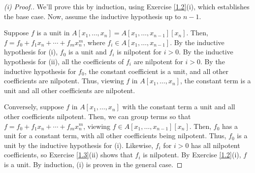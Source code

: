 \begin{proof}[(i) Proof.]
We'll prove this by induction, using Exercise \ref{1.2}(i), which establishes the base case. Now, assume the inductive hypothesis up to $n-1$.

Suppose $f$ is a unit in $A[x_1,\ldots,x_n] = A[x_1,\ldots,x_{n-1}][x_n]$. Then, $f = f_0 + f_1 x_n + \cdots + f_m x_n^m$, where 
$f_i \in A[x_1,\ldots,x_{n-1}]$. By the inductive hypothesis for (i), $f_0$ is a unit and $f_i$ is nilpotent for $i > 0$. By the inductive hypothesis 
for (ii), all the coefficients of $f_i$ are nilpotent for $i > 0$. By the inductive hypothesis for $f_0$, the constant coefficient is a unit, and all
other coefficients are nilpotent. Thus, viewing $f$ in $A[x_1,\ldots,x_n]$, the constant term is a unit and all other coefficients are nilpotent.

Conversely, suppose $f$ in $A[x_1,\ldots,x_n]$ with the constant term a unit and all other coefficients nilpotent. Then, we can group terms so that
$f = f_0 + f_1 x_n + \cdots + f_m x_n^m$, viewing $f \in A[x_1,\ldots,x_{n-1}][x_n]$. Then, $f_0$ has a unit for a constant term, with all other 
coefficients being nilpotent. Thus, $f_0$ is a unit by the inductive hypothesis for (i). Likewise, $f_i$ for $i > 0$ has all nilpotent coefficients, so
Exercise \ref{1.3}(ii) shows that $f_i$ is nilpotent. By Exercise \ref{1.2}(i), $f$ is a unit. By induction, (i) is proven in the general case.
\end{proof}

